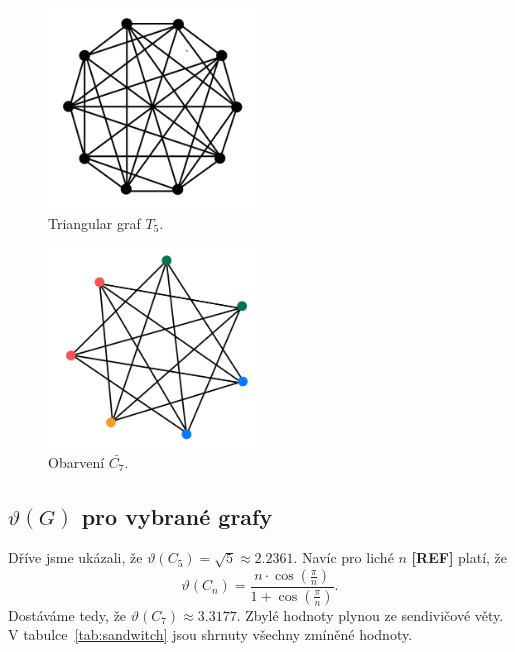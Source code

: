 \begin{figure}[h!]
    \centering
    \includegraphics[width=0.5\textwidth]{img/complement_petersen.jpeg}   
    \caption{Triangular graf $T_5$.}
    \label{fig:complement_petersen}
\end{figure}

\begin{figure}[h!]
    \centering
    \includegraphics[width=0.5\textwidth]{img/complement_c7.jpeg}   
    \caption{Obarvení $\bar{C_7}$.}
    \label{fig:complement_c7}
\end{figure}

\subsection*{$\vartheta(G)$ pro vybrané grafy}

Dříve jsme ukázali, že $\vartheta(C_5) = \sqrt{5} \approx 2.2361$. Navíc pro liché $n$ \textbf{[REF]} platí, že
$$
    \vartheta(C_n) = \frac{n \cdot \cos(\frac{\pi}{n})}{1 + \cos(\frac{\pi}{n})}.
$$
Dostáváme tedy, že $\vartheta({C_7}) \approx 3.3177$. Zbylé hodnoty plynou ze sendivičové věty. V tabulce~\ref{tab:sandwitch} jsou shrnuty všechny zmíněné hodnoty.

